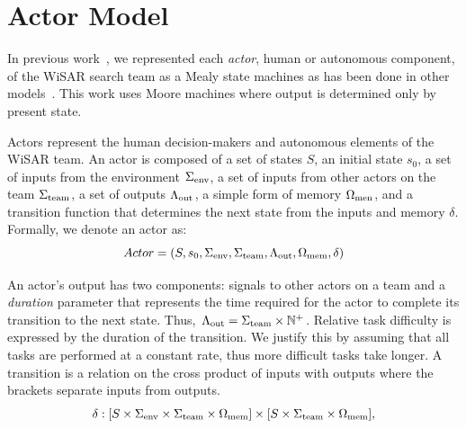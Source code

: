 \documentclass[letterpaper]{article}
\begin{document}
\section{Actor Model} 

In previous work~\cite{gledhill2013modelinguas}, we represented each {\em actor}, human or autonomous component, of the WiSAR search team as a Mealy state machines as has been done in other models~\cite{bolton2013litreview}. This work uses Moore machines where output is determined only by present state.

Actors represent the human decision-makers and autonomous elements of the WiSAR team.  An actor is composed of a set of states $S$, an initial state $s_0$, a set of inputs from the environment $\Sigma_{\rm env}$, a set of inputs from other actors on the team $\Sigma_{\rm team}$, a set of outputs $\Lambda_{\rm out}$, a simple form of memory $\Omega_{\rm men}$, and a transition function that determines the next state from the inputs and memory $\delta$. Formally, we denote an actor as:
\begin{equation}
 	Actor = (S, s_0, \Sigma_{\rm env}, \Sigma_{\rm team}, \Lambda_{\rm out}, \Omega_{\rm mem},\delta)
 \label{eq:actor}
 \end{equation}

 An actor's output has two components: signals to other actors on a team and a {\em duration} parameter that represents the time required for the actor to complete its transition to the next state.  Thus, $\Lambda_{\rm out}=\Sigma_{\rm team} \times \mathbb{N}^+$.
Relative task difficulty is expressed by the duration of the transition.
We justify this by assuming that all tasks are performed at a constant rate, thus more difficult tasks take longer.
 A transition is a relation on the cross product of inputs with outputs where the brackets separate inputs from outputs.
\begin{equation}
 \delta:[S\times\Sigma_{\rm env}\times\Sigma_{\rm team}\times\Omega_{\rm mem}] \times [S\times \Sigma_{\rm team} \times \Omega_{\rm mem}], 
\end{equation} 
 
\end{document}
